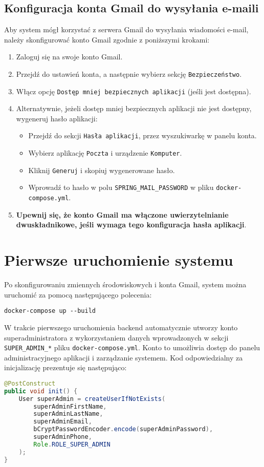 \subsection{Konfiguracja konta Gmail do wysyłania e-maili}
Aby system mógł korzystać z serwera Gmail do wysyłania wiadomości e-mail, należy skonfigurować konto Gmail zgodnie z poniższymi krokami:

\begin{enumerate}
    \item Zaloguj się na swoje konto Gmail.
    \item Przejdź do ustawień konta, a następnie wybierz sekcję \texttt{Bezpieczeństwo}.
    \item Włącz opcję \texttt{Dostęp mniej bezpiecznych aplikacji} (jeśli jest dostępna).
    \item Alternatywnie, jeżeli dostęp mniej bezpiecznych aplikacji nie jest dostępny, wygeneruj hasło aplikacji:
    \begin{itemize}
        \item Przejdź do sekcji \texttt{Hasła aplikacji}, przez wyszukiwarkę w panelu konta.
        \item Wybierz aplikację \texttt{Poczta} i urządzenie \texttt{Komputer}.
        \item Kliknij \texttt{Generuj} i skopiuj wygenerowane hasło.
        \item Wprowadź to hasło w polu \texttt{SPRING\_MAIL\_PASSWORD} w pliku \texttt{docker-compose.yml}.
    \end{itemize}
    \item \textbf{Upewnij się, że konto Gmail ma włączone uwierzytelnianie dwuskładnikowe, jeśli wymaga tego konfiguracja hasła aplikacji}.
\end{enumerate}

\section{Pierwsze uruchomienie systemu}
Po skonfigurowaniu zmiennych środowiskowych i konta Gmail, system można uruchomić za pomocą następującego polecenia:
\begin{verbatim}
docker-compose up --build
\end{verbatim}

W trakcie pierwszego uruchomienia backend automatycznie utworzy konto superadministratora z wykorzystaniem danych wprowadzonych w sekcji \texttt{SUPER\_ADMIN\_*} pliku \texttt{docker-compose.yml}. Konto to umożliwia dostęp do panelu administracyjnego aplikacji i zarządzanie systemem. Kod odpowiedzialny za inicjalizację prezentuje się następująco:
\begin{lstlisting}[language=Java, style=JavaStyle, caption=Kod inicjalizacji superadministratora]
@PostConstruct
public void init() {
    User superAdmin = createUserIfNotExists(
        superAdminFirstName,
        superAdminLastName,
        superAdminEmail,
        bCryptPasswordEncoder.encode(superAdminPassword),
        superAdminPhone,
        Role.ROLE_SUPER_ADMIN
    );
}
\end{lstlisting}


